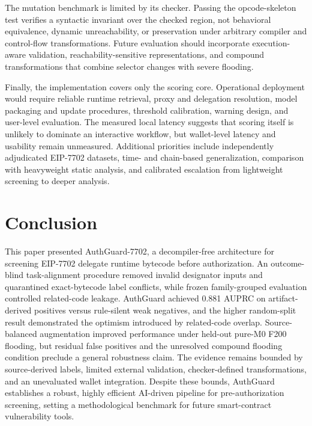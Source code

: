 \documentclass[conference]{IEEEtran}
\begin{document}
The mutation benchmark is limited by its checker. Passing the opcode-skeleton test verifies a syntactic invariant over the checked region, not behavioral equivalence, dynamic unreachability, or preservation under arbitrary compiler and control-flow transformations. Future evaluation should incorporate execution-aware validation, reachability-sensitive representations, and compound transformations that combine selector changes with severe flooding.

Finally, the implementation covers only the scoring core. Operational deployment would require reliable runtime retrieval, proxy and delegation resolution, model packaging and update procedures, threshold calibration, warning design, and user-level evaluation. The measured local latency suggests that scoring itself is unlikely to dominate an interactive workflow, but wallet-level latency and usability remain unmeasured. Additional priorities include independently adjudicated EIP-7702 datasets, time- and chain-based generalization, comparison with heavyweight static analysis, and calibrated escalation from lightweight screening to deeper analysis.

\section{Conclusion}
\label{sec:conclusion}

This paper presented AuthGuard-7702, a decompiler-free architecture for screening EIP-7702 delegate runtime bytecode before authorization. An outcome-blind task-alignment procedure removed invalid designator inputs and quarantined exact-bytecode label conflicts, while frozen family-grouped evaluation controlled related-code leakage. AuthGuard achieved 0.881 AUPRC on artifact-derived positives versus rule-silent weak negatives, and the higher random-split result demonstrated the optimism introduced by related-code overlap. Source-balanced augmentation improved performance under held-out pure-M0 F200 flooding, but residual false positives and the unresolved compound flooding condition preclude a general robustness claim. The evidence remains bounded by source-derived labels, limited external validation, checker-defined transformations, and an unevaluated wallet integration. Despite these bounds, AuthGuard establishes a robust, highly efficient AI-driven pipeline for pre-authorization screening, setting a methodological benchmark for future smart-contract vulnerability tools.



\end{document}
